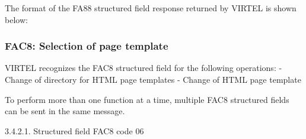 \documentclass[letterpaper,10pt,english]{sphinxmanual}
\begin{document}

The format of the FA88 structured field response returned by VIRTEL is shown below:

\begin{sphinxVerbatim}[commandchars=\\\{\}]
            
        
   
   
                 
       
       
      
     
     
\end{sphinxVerbatim}



\subsubsection{FAC8: Selection of page template}
\label{\detokenize{User_Guide:fac8-selection-of-page-template}}
VIRTEL recognizes the FAC8 structured field for the following operations:
- Change of directory for HTML page templates
- Change of HTML page template

To perform more than one function at a time, multiple FAC8 structured fields can be sent in the same message.

3.4.2.1. Structured field FAC8 code 06
\end{document}
